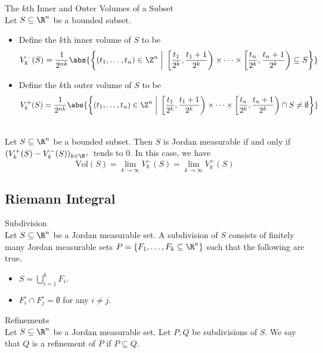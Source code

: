 \documentclass[a4paper]{article}
\begin{document}
\begin{defn}{The $k$th Inner and Outer Volumes of a Subset}{}\\
Let $S\subseteq\R^n$ be a bounded subset. 
\begin{itemize}
\item Define the $k$th inner volume of $S$ to be $$V_k^-(S)=\frac{1}{2^{nk}}\abs{\left\{(t_1,\dots,t_n)\in\Z^n\;\bigg{|}\;\left[\frac{t_1}{2^k},\frac{t_1+1}{2^k}\right)\times\cdots\times\left[\frac{t_n}{2^k},\frac{t_n+1}{2^k}\right)\subseteq S\right\}}$$
\item Define the $k$th outer volume of $S$ to be $$V_k^+(S)=\frac{1}{2^{nk}}\abs{\left\{(t_1,\dots,t_n)\in\Z^n\;\bigg{|}\;\left[\frac{t_1}{2^k},\frac{t_1+1}{2^k}\right)\times\cdots\times\left[\frac{t_n}{2^k},\frac{t_n+1}{2^k}\right)\cap S\neq\emptyset\right\}}$$
\end{itemize}
\end{defn}

\begin{prp}{}{}\\
Let $S\subseteq\R^n$ be a bounded subset. Then $S$ is Jordan measurable if and only if $(V_k^+(S)-V_k^-(S))_{k\in\N^+}$ tends to $0$. In this case, we have $$\text{Vol}(S)=\lim_{k\to\infty}V_k^-(S)=\lim_{k\to\infty}V_k^+(S)$$
\end{prp}

\subsection{Riemann Integral}
\begin{defn}{Subdivision}{}\\
Let $S\subseteq\R^n$ be a Jordan measurable set. A subdivision of $S$ consists of finitely many Jordan measurable sets $P=\{F_1,\dots,F_k\subseteq\R^n\}$ such that the following are true. 
\begin{itemize}
\item $S=\bigcup_{i=1}^kF_i$. 
\item $F_i^\circ\cap F_j^\circ=\emptyset$ for any $i\neq j$. 
\end{itemize}
\end{defn}

\begin{defn}{Refinements}{}\\
Let $S\subseteq\R^n$ be a Jordan measurable set. Let $P,Q$ be subdivisions of $S$. We say that $Q$ is a refinement of $P$ if $P\subseteq Q$. 
\end{defn}
\end{document}
